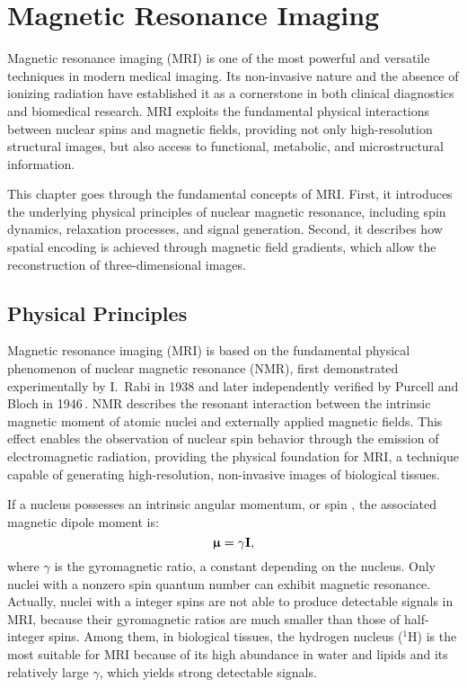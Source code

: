 \chapter{Magnetic Resonance Imaging} \label{chap:MagneticResonanceImaging}
\vspace{1cm}

Magnetic resonance imaging (MRI) is one of the most powerful and versatile techniques in modern medical imaging. Its non-invasive nature and the absence of ionizing radiation have established it as a cornerstone in both clinical diagnostics and biomedical research. MRI exploits the fundamental physical interactions between nuclear spins and magnetic fields, providing not only high-resolution structural images, but also access to functional, metabolic, and microstructural information.

This chapter goes through the fundamental concepts of MRI. First, it introduces the underlying physical principles of nuclear magnetic resonance, including spin dynamics, relaxation processes, and signal generation. Second, it describes how spatial encoding is achieved through magnetic field gradients, which allow the reconstruction of three-dimensional images.

\section{Physical Principles}
Magnetic resonance imaging (MRI) is based on the fundamental physical phenomenon of nuclear magnetic resonance (NMR), first demonstrated experimentally by I.\ Rabi in 1938 and later independently verified by Purcell and Bloch in 1946\,\cite{NMR}. NMR describes the resonant interaction between the intrinsic magnetic moment of atomic nuclei and externally applied magnetic fields. This effect enables the observation of nuclear spin behavior through the emission of electromagnetic radiation, providing the physical foundation for MRI, a technique capable of generating high-resolution, non-invasive images of biological tissues.

If a nucleus possesses an intrinsic angular momentum, or spin , the associated magnetic dipole moment is:
\begin{equation}
    \bm{\upmu} = \gamma \mathbf{I},
\end{equation}
where $\gamma$ is the gyromagnetic ratio, a constant depending on the nucleus. Only nuclei with a nonzero spin quantum number can exhibit magnetic resonance. Actually, nuclei with a integer spins are not able to produce detectable signals in MRI, because their gyromagnetic ratios are much smaller than those of half-integer spins. Among them, in biological tissues, the hydrogen nucleus ($^1$H) is the most suitable for MRI because of its high abundance in water and lipids and its relatively large $\gamma$, which yields strong detectable signals.


